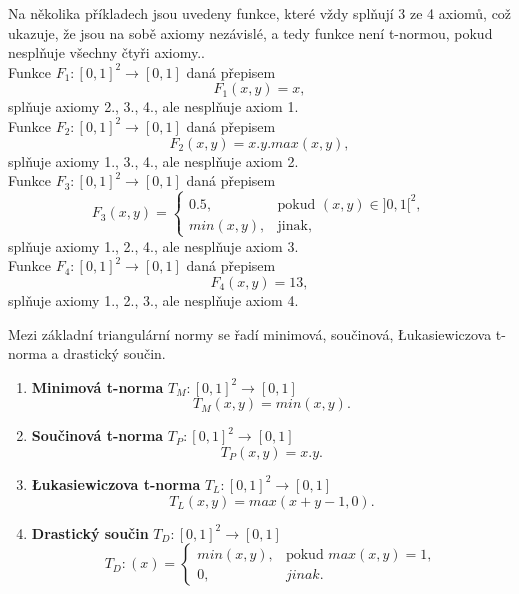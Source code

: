 \begin{example} Na několika příkladech jsou uvedeny funkce, které vždy spl\v nují 3 ze 4  axiom\r u, což ukazuje, že jsou na sobě axiomy nez\' avislé, a tedy funkce není t-normou, pokud nespl\v nuje všechny čtyři axiomy..\\ 
    Funkce $F_1 : [0, 1]^2 \rightarrow [0, 1]$ daná přepisem\\
    $$F_1(x,y) = x,$$
    spl\v nuje axiomy 2., 3., 4., ale nespl\v nuje axiom 1.\\
    
    Funkce $F_2 : [0, 1]^2 \rightarrow [0, 1]$ daná přepisem\\
    $$F_2(x,y) = x.y.max(x,y),$$
    spl\v nuje axiomy 1., 3., 4., ale nespl\v nuje axiom 2.\\

    Funkce $F_3 : [0, 1]^2 \rightarrow [0, 1]$ daná přepisem\\
    $$ F_3(x,y)=\begin{cases} 0.5, & \mbox{pokud }(x, y) \in ]0,1[^2, \\
         min(x,y), & \mbox{jinak,}\end{cases} $$
    spl\v nuje axiomy 1., 2., 4., ale nespl\v nuje axiom 3.\\
    
    Funkce $F_4 : [0, 1]^2 \rightarrow [0, 1]$ daná přepisem\\
    $$F_4(x,y) = 13,$$
    spl\v nuje axiomy 1., 2., 3., ale nespl\v nuje axiom 4.\\

  


\end{example}

Mezi základní triangulární normy se řadí minimová, součinová, Łukasiewiczova t-norma a drastický součin.
\begin{example}
\cite{KMP}
    \begin{enumerate}
    \item \textbf{Minimová t-norma} $T_M: [0,1]^2 \rightarrow [0,1]$
    $$T_M(x,y) = min(x,y).$$
    \item \textbf{Součinová t-norma} $T_P: [0,1]^2 \rightarrow [0,1]$
    $$T_P(x,y) = x.y.$$
    \item \textbf{Łukasiewiczova t-norma} $T_L: [0,1]^2 \rightarrow [0,1]$
    $$T_L(x,y) = max(x+y-1,0).$$
    \item \textbf{Drastický součin} $T_D: [0,1]^2 \rightarrow [0,1]$
    $$T_D:(x)=\begin{cases} min(x,y), & \mbox{pokud }  max(x,y) = 1,\\ 
    0, &  jinak.  \end{cases}$$
\end{enumerate}
\end{example}

